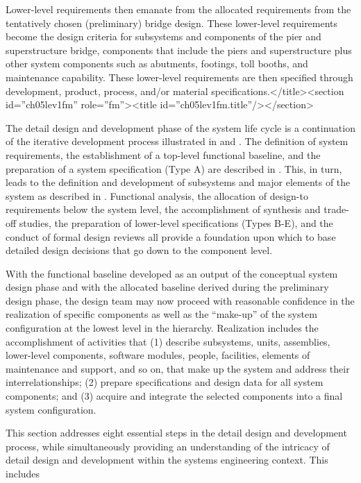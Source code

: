 Lower-level requirements then emanate from the allocated requirements from the tentatively chosen (preliminary) bridge design. These lower-level requirements become the design criteria for subsystems and components of the pier and superstructure bridge, components that include the piers and superstructure plus other system components such as abutments, footings, toll booths, and maintenance capability. These lower-level requirements are then specified through development, product, process, and/or material specifications.</title><section id=”ch05lev1fm” role=”fm”><title id=”ch05lev1fm.title”/></section>

The detail design and development phase of the system life cycle is a continuation of the iterative development process illustrated in  and . The definition of system requirements, the establishment of a top-level functional baseline, and the preparation of a system specification (Type A) are described in . This, in turn, leads to the definition and development of subsystems and major elements of the system as described in . Functional analysis, the allocation of design-to requirements below the system level, the accomplishment of synthesis and trade-off studies, the preparation of lower-level specifications (Types B-E), and the conduct of formal design reviews all provide a foundation upon which to base detailed design decisions that go down to the component level.

With the functional baseline developed as an output of the conceptual system design phase and with the allocated baseline derived during the preliminary design phase, the design team may now proceed with reasonable confidence in the realization of specific components as well as the ``make-up'' of the system configuration at the lowest level in the hierarchy. Realization includes the accomplishment of activities that (1) describe subsystems, units, assemblies, lower-level components, software modules, people, facilities, elements of maintenance and support, and so on, that make up the system and address their interrelationships; (2) prepare specifications and design data for all system components; and (3) acquire and integrate the selected components into a final system configuration.

This section addresses eight essential steps in the detail design and development process, while simultaneously providing an understanding of the intricacy of detail design and development within the systems engineering context. This includes

